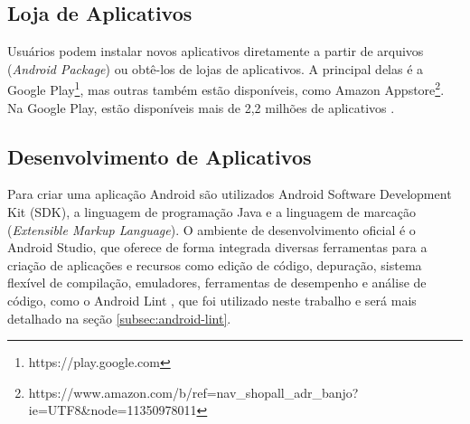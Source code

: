 \subsection{Loja de Aplicativos} \label{subsec:loja-aplicativos}

Usuários podem instalar novos aplicativos diretamente a partir de arquivos 
(\textit{Android Package})
ou obtê-los de lojas de aplicativos. A principal delas é a Google
Play\footnote{https://play.google.com}, mas outras também estão disponíveis, como
Amazon Appstore\footnote{https://www.amazon.com/b/ref=nav\_shopall\_adr\_banjo?ie=UTF8\&node=11350978011}.
Na Google Play, estão disponíveis mais de 2,2 milhões de aplicativos \cite{Statista2016}.

\subsection{Desenvolvimento de Aplicativos}
\label{subsec:desenvolvimento-aplicativos}

Para criar uma aplicação Android são utilizados Android Software Development Kit
(SDK),
a linguagem de programação Java e a linguagem de marcação
(\textit{Extensible Markup Language}).
O ambiente de desenvolvimento oficial é o Android Studio\cite{Studio2016}, que
oferece de forma integrada diversas ferramentas para a criação de aplicações e
recursos como edição de código, depuração, sistema flexível de compilação, emuladores,
ferramentas de desempenho e análise de código, como o Android Lint \cite{Lint2016},
que foi utilizado neste trabalho e será mais detalhado na seção \ref{subsec:android-lint}.

